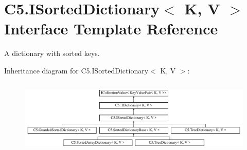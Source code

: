\hypertarget{interface_c5_1_1_i_sorted_dictionary}{}\section{C5.\+I\+Sorted\+Dictionary$<$ K, V $>$ Interface Template Reference}
\label{interface_c5_1_1_i_sorted_dictionary}


A dictionary with sorted keys.  


Inheritance diagram for C5.\+I\+Sorted\+Dictionary$<$ K, V $>$\+:\begin{figure}[H]
\begin{center}
\leavevmode
\includegraphics[height=3.603604cm]{interface_c5_1_1_i_sorted_dictionary}
\end{center}
\end{figure}
